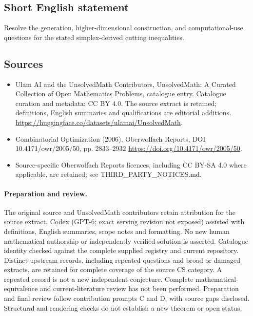 \documentclass[11pt]{article}
\begin{document}
\subsection{Short English statement}
Resolve the generation, higher-dimensional construction, and computational-use questions for the stated simplex-derived cutting inequalities.
\subsection{Sources}
\begin{itemize}
\item[\hypertarget{source:statement:1}{S1}] Ulam AI and the UnsolvedMath Contributors, UnsolvedMath: A Curated Collection of Open Mathematics Problems, catalogue entry. Catalogue curation and metadata: CC BY 4.0. The source extract is retained; definitions, English summaries and qualifications are editorial additions.
\url{https://huggingface.co/datasets/ulamai/UnsolvedMath}.
\item[\hypertarget{source:statement:2}{S2}] Combinatorial Optimization (2006), Oberwolfach Reports, DOI 10.4171/owr/2005/50, pp. 2833--2932
\url{https://doi.org/10.4171/owr/2005/50}.
\item Source-specific Oberwolfach Reports licences, including CC BY-SA 4.0 where applicable, are retained; see THIRD\_PARTY\_NOTICES.md.
\end{itemize}
\paragraph{Preparation and review.}
The original source and UnsolvedMath contributors retain attribution for the source extract. Codex (GPT-6; exact serving revision not exposed) assisted with definitions, English summaries, scope notes and formatting. No new human mathematical authorship or independently verified solution is asserted. Catalogue identity checked against the complete supplied registry and current repository. Distinct upstream records, including repeated questions and broad or damaged extracts, are retained for complete coverage of the source CS category. A repeated record is not a new independent conjecture. Complete mathematical-equivalence and current-literature review has not been performed. Preparation and final review follow contribution prompts C and D, with source gaps disclosed. Structural and rendering checks do not establish a new theorem or open status.
\label{end:statement}
\end{document}
